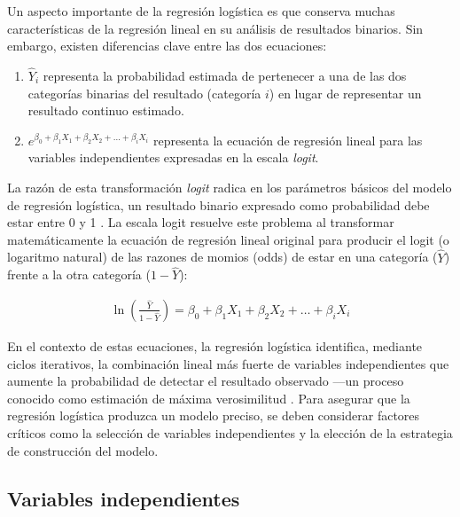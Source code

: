\documentclass[12pt]{article}
\begin{document}
Un aspecto importante de la regresi\'on log\'istica es que conserva muchas caracter\'isticas de la regresi\'on lineal en su an\'alisis de resultados binarios. Sin embargo, existen diferencias clave entre las dos ecuaciones:

\begin{enumerate}
  \item $\hat{Y}_i$ representa la probabilidad estimada de pertenecer a una de las dos categor\'ias binarias del resultado (categor\'ia $i$) en lugar de representar un resultado continuo estimado.
  
  \item $e^{\beta_0 + \beta_1 X_1 + \beta_2 X_2 + \ldots + \beta_i X_i}$ representa la ecuaci\'on de regresi\'on lineal para las variables independientes expresadas en la escala \textit{logit}.
\end{enumerate}

La raz\'on de esta transformaci\'on \textit{logit} radica en los par\'ametros b\'asicos del modelo de regresi\'on log\'istica, un resultado binario expresado como probabilidad debe estar entre 0 y 1 \cite{darlington1990}. La escala logit resuelve este problema al transformar matem\'aticamente la ecuaci\'on de regresi\'on lineal original para producir el logit (o logaritmo natural) de las razones de momios (odds) de estar en una categor\'ia ($\hat{Y}$) frente a la otra categor\'ia ($1 - \hat{Y}$):

\begin{eqnarray}
\ln\left(\frac{\hat{Y}}{1 - \hat{Y}}\right) = \beta_0 + \beta_1 X_1 + \beta_2 X_2 + \ldots + \beta_i X_i
\end{eqnarray}

En el contexto de estas ecuaciones, la regresi\'on log\'istica identifica, mediante ciclos iterativos, la combinaci\'on lineal m\'as fuerte de variables independientes que aumente la probabilidad de detectar el resultado observado —un proceso conocido como estimaci\'on de m\'axima verosimilitud \cite{tabachnick2007,hosmer2000}. Para asegurar que la regresi\'on log\'istica produzca un modelo preciso, se deben considerar factores cr\'iticos como la selecci\'on de variables independientes y la elecci\'on de la estrategia de construcci\'on del modelo.

\subsection{Variables independientes}
\end{document}

